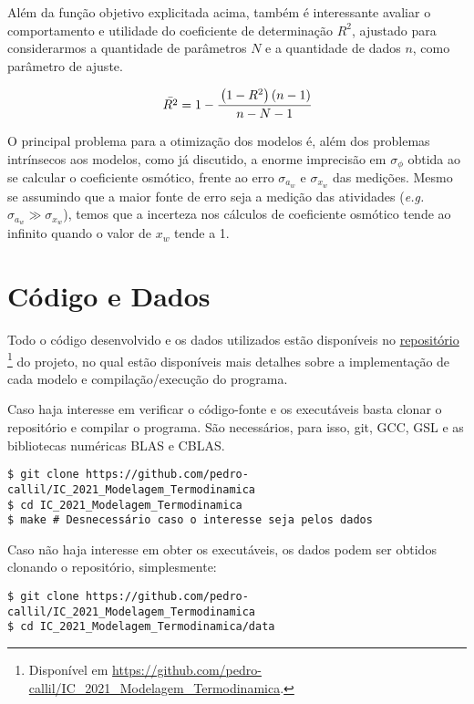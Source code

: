 \documentclass[
	12pt,				%
	openright,
	twoside,
	a4paper,			%
	english,			%
	french,				%
	spanish,			%
	brazil				%
	]{abntex2}
\begin{document}
Além da função objetivo explicitada acima, também é interessante avaliar o
comportamento e utilidade do coeficiente de determinação $R^2$, ajustado para
considerarmos a quantidade de parâmetros $N$ e a quantidade de dados $n$, como
parâmetro de ajuste.

\begin{equation}
	\bar{R^2} = 1 - \cfrac{\left( 1 - R^2 \right) \left( n - 1 \right)}
		{n - N - 1}
\end{equation}

O principal problema para a otimização dos modelos é, além dos problemas
intrínsecos aos modelos, como já discutido, a enorme imprecisão em
$\sigma_\phi$ obtida ao se calcular o coeficiente osmótico, frente ao erro
$\sigma_{a_w}$ e $\sigma_{x_w}$ das medições. Mesmo se assumindo que a maior
fonte de erro seja a medição das atividades (\textit{e.g.} $\sigma_{a_w} \gg
\sigma_{x_w}$), temos que a incerteza nos cálculos de coeficiente osmótico
tende ao infinito quando o valor de $x_w$ tende a 1.

\chapter{Código e Dados}

Todo o código desenvolvido e os dados utilizados estão disponíveis no
\href{https://github.com/pedro-callil/IC_2021_Modelagem_Termodinamica}{repositório}
\footnote{Disponível em
	\url{https://github.com/pedro-callil/IC_2021_Modelagem_Termodinamica}.}
do projeto, no qual estão disponíveis mais detalhes sobre a implementação de
cada modelo e compilação/execução do programa.

Caso haja interesse em verificar o código-fonte e os executáveis basta clonar o
repositório e compilar o programa. São necessários, para isso, git, GCC, GSL e as
bibliotecas numéricas BLAS e CBLAS.

\begin{verbatim}
$ git clone https://github.com/pedro-callil/IC_2021_Modelagem_Termodinamica
$ cd IC_2021_Modelagem_Termodinamica
$ make # Desnecessário caso o interesse seja pelos dados
\end{verbatim}

Caso não haja interesse em obter os executáveis, os dados podem ser obtidos
clonando o repositório, simplesmente:

\begin{verbatim}
$ git clone https://github.com/pedro-callil/IC_2021_Modelagem_Termodinamica
$ cd IC_2021_Modelagem_Termodinamica/data
\end{verbatim}
\end{document}
